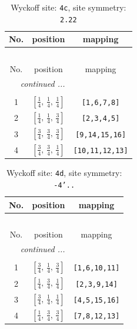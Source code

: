 \documentclass[fleqn,8pt]{jsarticle}
\begin{document}
\renewcommand{\arraystretch}{1.2}
\begin{longtable}{ccc}
\caption{Wyckoff site: {\tt 4c}, site symmetry: {\tt 2.22}}
 \\
 \hline \hline
No. & position & mapping \\ \hline \endfirsthead

\multicolumn{2}{l}{\tablename\ \thetable{}} \\
 \hline \hline
No. & position & mapping \\ \hline \endhead

 \hline \hline
\multicolumn{2}{r}{\footnotesize\it continued ...} \\ \endfoot

 \hline \hline
\multicolumn{2}{r}{} \\ \endlastfoot

1 & $\left[ \frac{1}{4},\, \frac{1}{4},\, \frac{1}{4} \right]$ & {\tt [1,6,7,8]} \\ \hline
2 & $\left[ \frac{1}{4},\, \frac{1}{4},\, \frac{3}{4} \right]$ & {\tt [2,3,4,5]} \\ \hline
3 & $\left[ \frac{3}{4},\, \frac{3}{4},\, \frac{3}{4} \right]$ & {\tt [9,14,15,16]} \\ \hline
4 & $\left[ \frac{3}{4},\, \frac{3}{4},\, \frac{1}{4} \right]$ & {\tt [10,11,12,13]} \\
\end{longtable}
\renewcommand{\arraystretch}{1.2}
\begin{longtable}{ccc}
\caption{Wyckoff site: {\tt 4d}, site symmetry: {\tt -4'..}}
 \\
 \hline \hline
No. & position & mapping \\ \hline \endfirsthead

\multicolumn{2}{l}{\tablename\ \thetable{}} \\
 \hline \hline
No. & position & mapping \\ \hline \endhead

 \hline \hline
\multicolumn{2}{r}{\footnotesize\it continued ...} \\ \endfoot

 \hline \hline
\multicolumn{2}{r}{} \\ \endlastfoot

1 & $\left[ \frac{3}{4},\, \frac{1}{4},\, \frac{3}{4} \right]$ & {\tt [1,6,10,11]} \\ \hline
2 & $\left[ \frac{1}{4},\, \frac{3}{4},\, \frac{1}{4} \right]$ & {\tt [2,3,9,14]} \\ \hline
3 & $\left[ \frac{3}{4},\, \frac{1}{4},\, \frac{1}{4} \right]$ & {\tt [4,5,15,16]} \\ \hline
4 & $\left[ \frac{1}{4},\, \frac{3}{4},\, \frac{3}{4} \right]$ & {\tt [7,8,12,13]} \\
\end{longtable}
\end{document}
